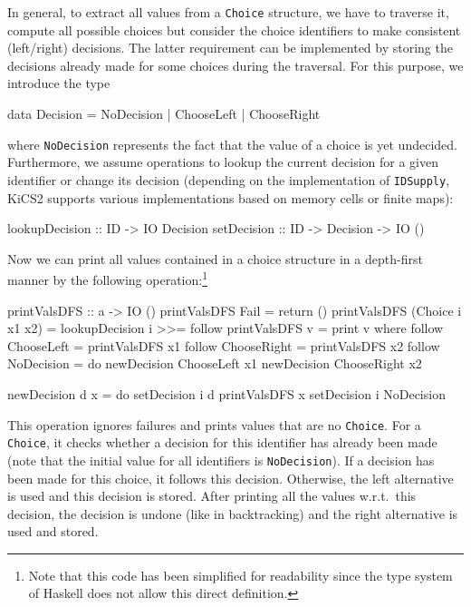 \documentclass{llncs}
\newcommand{\code}[1]{\mbox{\small\texttt{#1}}}
\begin{document}
In general, to extract all values from a \code{Choice} structure,
we have to traverse it, compute all possible choices
but consider the choice identifiers to make consistent (left/right)
decisions.
The latter requirement can be implemented by storing
the decisions already made for some choices during the traversal.
For this purpose, we introduce the type
\begin{haskell}
  data Decision = NoDecision | ChooseLeft | ChooseRight
\end{haskell}
where \code{NoDecision} represents the fact that the value of a choice
is yet undecided.
Furthermore, we assume operations to lookup the current decision
for a given identifier or change its decision (depending on the implementation
of \code{IDSupply}, KiCS2 supports various implementations
based on memory cells or finite maps):
\begin{haskell}
  lookupDecision :: ID -> IO Decision
  setDecision    :: ID -> Decision -> IO ()
\end{haskell}
%
Now we can print all values contained in a choice structure
in a depth-first manner by the following operation:\footnote{%
Note that this code has been simplified for readability
since the type system of Haskell does not
allow this direct definition.}
\label{sec:printValsDFS}
\begin{haskell}
  printValsDFS :: a -> IO ()
  printValsDFS Fail             = return ()
  printValsDFS (Choice i x1 x2) = lookupDecision i >>= follow
  printValsDFS v                = print v
   where
    follow ChooseLeft  = printValsDFS x1
    follow ChooseRight = printValsDFS x2
    follow NoDecision  = do newDecision ChooseLeft  x1
                            newDecision ChooseRight x2

    newDecision d x = do setDecision i d
                         printValsDFS x
                         setDecision i NoDecision
\end{haskell}
This operation ignores failures and prints values that are no \code{Choice}.
For a \code{Choice}, it checks whether a decision for
this identifier has already been made (note that the initial value
for all identifiers is \code{NoDecision}).
If a decision has been made for this choice, it follows this decision.
Otherwise, the left alternative is used and this decision is stored.
After printing
all the values w.r.t.\ this decision,
the decision is undone (like in backtracking)
and the right alternative is used and stored.
\end{document}
